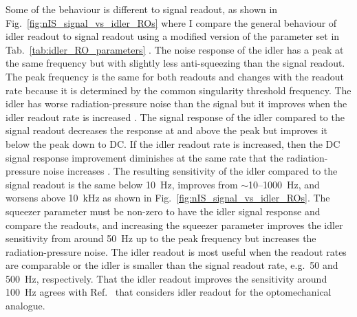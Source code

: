 Some of the behaviour is different to signal readout, as shown in Fig.~\ref{fig:nIS_signal_vs_idler_ROs} where I compare the general behaviour of idler readout to signal readout using a modified version of the parameter set in Tab.~\ref{tab:idler_RO_parameters} . The noise response of the idler has a peak at the same frequency but with slightly less anti-squeezing  than the signal readout. The peak frequency is the same for both readouts and changes with the readout rate because it is determined by the common singularity threshold frequency. The idler has worse radiation-pressure noise than the signal  but it improves when the idler readout rate is increased . The signal response of the idler compared to the signal readout decreases the response at and above the peak but improves it below the peak down to DC. If the idler readout rate is increased, then the DC signal response improvement diminishes at the same rate that the radiation-pressure noise increases . 
The resulting sensitivity of the idler compared to the signal readout is the same below 10~Hz, improves from $\sim$10--1000~Hz, and worsens above 10~kHz as shown in Fig.~\ref{fig:nIS_signal_vs_idler_ROs}. The squeezer parameter must be non-zero to have the idler signal response and compare the readouts, and increasing the squeezer parameter improves the idler sensitivity from around 50~Hz up to the peak frequency but increases the radiation-pressure noise. The idler readout is most useful when the readout rates are comparable or the idler is smaller than the signal readout rate, e.g.\ 50 and 500~Hz, respectively. 
That the idler readout improves the sensitivity around 100~Hz agrees with Ref.~\cite{liEnhancingInterferometerSensitivity2021} that considers idler readout for the optomechanical analogue.

